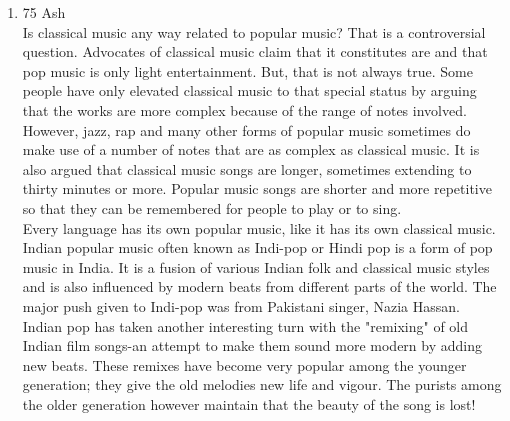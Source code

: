 \documentclass[12pt]{article}
\begin{document}
\begin{enumerate}
      Unfortunately, this otherwise rosy prospect has one significant cloud on the horizon. In recent years, there has been a move towards returning some of the land to the Aboriginal people. As Western society and culture have flourished on Australian soil, tribal people have been forced ever farther inland in an attempt to maintain their traditional ways of living, a desire that the government has striven to respect.\\

      One of the central beliefs of the Aboriginal religion is that certain natural formations have spiritual significance and must be treated accordingly. Strict guidelines determine who may visit these sites and at what times. Unfortunately, many of these sites are the very natural wonders tourists flock to see. If non-Aboriginal people are forbidden to visit these natural wonders, many may choose not to vacation in a region that surely needs the income generated by tourism.\\

      The Australian government has dealt with this dilemma thus far by trying to support both sides. The Aboriginal council is still trying to put an end to such use of certain sites, however, and it remains to be seen whether respect for tradition or economic desires will ultimately triumph.

    \item 75 Ash\\
      Is classical music any way related to popular music? That is a controversial question. Advocates of classical music claim that it constitutes are and that pop music is only light entertainment. But, that is not always true. Some people have only elevated classical music to that special status by arguing that the works are more complex because of the range of notes involved. However, jazz, rap and many other forms of popular music sometimes do make use of a number of notes that are as complex as classical music. It is also argued that classical music songs are longer, sometimes extending to thirty minutes or more. Popular music songs are shorter and more repetitive so that they can be remembered for people to play or to sing.\\

      Every language has its own popular music, like it has its own classical music. Indian popular music often known as Indi-pop or Hindi pop is a form of pop music in India. It is a fusion of various Indian folk and classical music styles and is also influenced by modern beats from different parts of the world. The major push given to Indi-pop was from Pakistani singer, Nazia Hassan. Indian pop has taken another interesting turn with the "remixing" of old Indian film songs-an attempt to make them sound more modern by adding new beats. These remixes have become very popular among the younger generation; they give the old melodies new life and vigour. The purists among the older generation however maintain that the beauty of the song is lost!


\end{enumerate}
\end{document}
